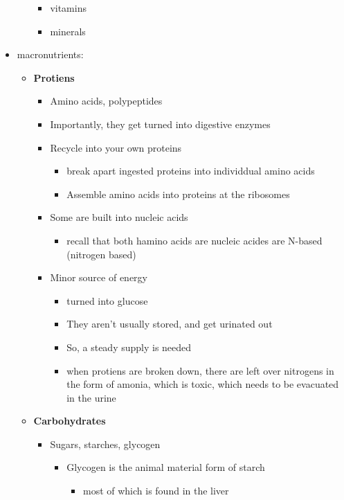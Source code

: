 \documentclass{article}
\theoremstyle{definition}
\begin{document}
\begin{itemize}
\begin{itemize}
\begin{itemize}
					\item vitamins
					\item minerals
				\end{itemize}
		\end{itemize}
	\item macronutrients:
		\begin{itemize}
			\item \textbf{Protiens}
				\begin{itemize}
					\item Amino acids, polypeptides
					\item Importantly, they get turned into digestive enzymes
					\item Recycle into your own proteins 
						\begin{itemize}
							\item break apart ingested proteins into individdual amino acids
							\item Assemble amino acids into proteins at the ribosomes
						\end{itemize}
					\item Some are built into nucleic acids
						\begin{itemize}
							\item recall that both hamino acids are nucleic acides are N-based (nitrogen based)
						\end{itemize}
					\item Minor source of energy
						\begin{itemize}
							\item turned into glucose
							\item They aren't usually stored, and get urinated out
							\item So, a steady supply is needed
							\item when protiens are broken down, there are left over nitrogens in the form of amonia, which is toxic, which needs to be evacuated in the urine
						\end{itemize}
				\end{itemize}
			\item \textbf{Carbohydrates} 
				\begin{itemize}
					\item Sugars, starches, glycogen
						\begin{itemize}
							\item Glycogen is the animal material form of starch
								\begin{itemize}
									\item most of which is found in the liver

\end{itemize}
\end{itemize}
\end{itemize}
\end{itemize}
\end{itemize}
\end{document}
